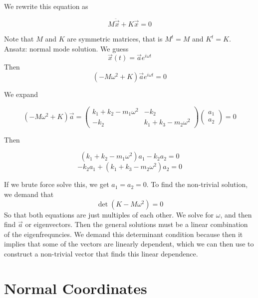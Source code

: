 \documentclass{article}
\newtheorem{one minute paper}[theorem]{One Minute Paper}
\begin{document}
We rewrite this equation as 

\begin{equation}
    M\ddot{\vec{x}} + K\vec{x} = 0
\end{equation}

Note that $M$ and $K$ are symmetric matrices, that is $M^{t} = M$ and $K^{t} = K$. Ansatz: normal mode solution. We guess 
\begin{equation}
    \vec{x}(t) = \vec{a}e^{i\omega t}
\end{equation}
Then 
\begin{equation}
    (-M\omega^2 + K)\vec{a}e^{i\omega t} = 0
\end{equation}

We expand 

\begin{equation}
    (-M\omega^2 + K)\vec{a} = \begin{pmatrix}
        k_1 + k_2 - m_1\omega^2 & -k_2 \\
        -k_2 & k_1 + k_3 -m_2\omega^2
    \end{pmatrix}\begin{pmatrix}
        a_1 \\
        a_2
    \end{pmatrix} = 0
\end{equation}

Then 

\begin{equation}
    (k_1 + k_2 -m_1\omega^2)a_1 - k_2a_2 = 0
\end{equation}
\begin{equation}
    -k_2a_1 + (k_1 + k_3 - m_2\omega^2)a_2 = 0
\end{equation}

If we brute force solve this, we get $a_1 = a_2 = 0$. To find the non-trivial solution, we demand that 
\begin{equation}
    \det(K - M\omega^2) = 0
\end{equation}
So that both equations are just multiples of each other. We solve for $\omega$, and then find $\vec{a}$ or eigenvectors. Then the general solutions must be a linear combination of the 
eigenfrequncies. We demand this determinant condition because then it implies that some of the vectors are linearly dependent, which we can then use to construct a non-trivial vector that finds this linear dependence.  

\section*{Normal Coordinates}
\end{document}
